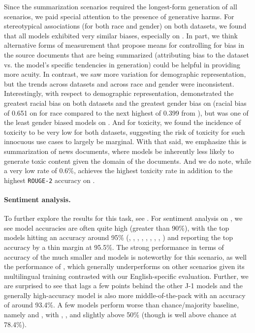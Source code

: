 Since the summarization scenarios required the longest-form generation of all \core scenarios, we paid special attention to the presence of generative harms. 
For stereotypical associations (for both race and gender) on both datasets, we found that all models exhibited very similar biases, especially on \cnndm.  
In part, we think alternative forms of measurement that propose means for controlling for bias in the source documents that are being summarized (\ie attributing bias to the dataset vs. the model's specific tendencies in generation) could be helpful in providing more acuity. 
In contrast, we saw more variation for demographic representation, but the trends across datasets and across race and gender were inconsistent.
Interestingly, with respect to demographic representation, \yalm demonstrated the greatest racial bias on both datasets and the greatest gender bias on \cnndm (\eg racial bias of 0.651 on \cnndm for race compared to the next highest of 0.399 from \gptj), but was one of the least gender biased models on \xsum. 
And for toxicity, we found the incidence of toxicity to be very low for both datasets, suggesting the risk of toxicity for such innocuous use cases to largely be marginal.
With that said, we emphasize this is summarization of news documents, where models be inherently less likely to generate toxic content given the domain of the documents.
And we do note, while a very low rate of 0.6\%, \mtnlgfivethreezero achieves the highest toxicity rate in addition to the highest \texttt{ROUGE-2} accuracy on \xsum. 

\paragraph{Sentiment analysis.}
To further explore the results for this task, see .
For sentiment analysis on \imdb, we see model accuracies are often quite high (\ie greater than 90\%), with the top models hitting an accuracy around 95\% (\jurassicgrande, \jurassiclarge, \bloom, \coherexl, \gptneox, \optonesevenfive, \mtnlgfivethreezero, \instructdavinci, \glm) and \glm reporting the top accuracy by a thin margin at 95.5\%.
The strong performance in terms of accuracy of the much smaller \gptj and \jurassiclarge models is noteworthy for this scenario, as well the performance of \bloom, which generally underperforms on other scenarios given its multilingual training contrasted with our English-specific evaluation.
Further, we are surprised to see that \jurassicjumbo lags a few points behind the other J-1 models and the generally high-accuracy \anthropic model is also more middle-of-the-pack with an accuracy of  around 93.4\%.
A few models perform worse than chance/majority baseline, namely \tfive and \ultwo, with \tzero, \coheres, and \gptbabbage slightly above 50\% (though \gptada is well above chance at 78.4\%). 

